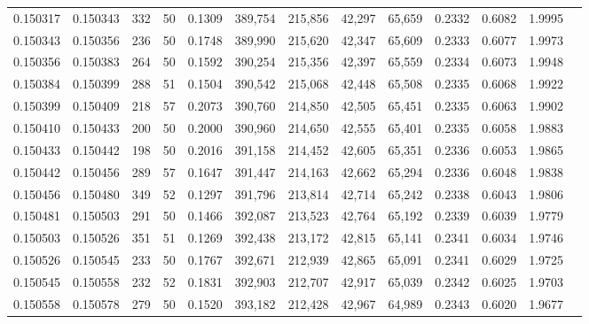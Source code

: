 \begin{tabular}{rrrrrrrrrrrrr}
0.150317 & 0.150343 &   332 &  50 &                                     0.1309 & 389,754 & 215,856 &  42,297 &  65,659 & 0.2332 & 0.6082 & 1.9995 \\
0.150343 & 0.150356 &   236 &  50 &                                     0.1748 & 389,990 & 215,620 &  42,347 &  65,609 & 0.2333 & 0.6077 & 1.9973 \\
0.150356 & 0.150383 &   264 &  50 &                                     0.1592 & 390,254 & 215,356 &  42,397 &  65,559 & 0.2334 & 0.6073 & 1.9948 \\
0.150384 & 0.150399 &   288 &  51 &                                     0.1504 & 390,542 & 215,068 &  42,448 &  65,508 & 0.2335 & 0.6068 & 1.9922 \\
0.150399 & 0.150409 &   218 &  57 &                                     0.2073 & 390,760 & 214,850 &  42,505 &  65,451 & 0.2335 & 0.6063 & 1.9902 \\
0.150410 & 0.150433 &   200 &  50 &                                     0.2000 & 390,960 & 214,650 &  42,555 &  65,401 & 0.2335 & 0.6058 & 1.9883 \\
0.150433 & 0.150442 &   198 &  50 &                                     0.2016 & 391,158 & 214,452 &  42,605 &  65,351 & 0.2336 & 0.6053 & 1.9865 \\
0.150442 & 0.150456 &   289 &  57 &                                     0.1647 & 391,447 & 214,163 &  42,662 &  65,294 & 0.2336 & 0.6048 & 1.9838 \\
0.150456 & 0.150480 &   349 &  52 &                                     0.1297 & 391,796 & 213,814 &  42,714 &  65,242 & 0.2338 & 0.6043 & 1.9806 \\
0.150481 & 0.150503 &   291 &  50 &                                     0.1466 & 392,087 & 213,523 &  42,764 &  65,192 & 0.2339 & 0.6039 & 1.9779 \\
0.150503 & 0.150526 &   351 &  51 &                                     0.1269 & 392,438 & 213,172 &  42,815 &  65,141 & 0.2341 & 0.6034 & 1.9746 \\
0.150526 & 0.150545 &   233 &  50 &                                     0.1767 & 392,671 & 212,939 &  42,865 &  65,091 & 0.2341 & 0.6029 & 1.9725 \\
0.150545 & 0.150558 &   232 &  52 &                                     0.1831 & 392,903 & 212,707 &  42,917 &  65,039 & 0.2342 & 0.6025 & 1.9703 \\
0.150558 & 0.150578 &   279 &  50 &                                     0.1520 & 393,182 & 212,428 &  42,967 &  64,989 & 0.2343 & 0.6020 & 1.9677 \\

\end{tabular}
